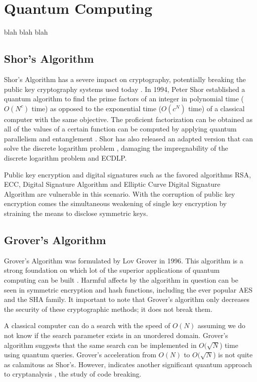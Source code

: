 \section{Quantum Computing}
blah blah blah

\subsection{Shor's Algorithm}
Shor's Algorithm has a severe impact on cryptography, potentially breaking the public key cryptography systems used today \cite{Q_Alg}.
In 1994, Peter Shor established a quantum algorithm to find the prime factors of an integer in polynomial time (\(O(N^c)\) time) as opposed to the exponential time (\(O(c^N)\) time) of a classical computer with the same objective. 
The proficient factorization can be obtained as all of the values of a certain function can be computed by applying quantum parallelism and entanglement \cite{Impact_QC_Cryptog_1}. 
Shor has also released an adapted version that can solve the discrete logarithm problem \cite{Post_Q_Cryptog}, damaging the impregnability of the discrete logarithm problem and ECDLP. 

Public key encryption and digital signatures such as the favored algorithms RSA, ECC, Digital Signature Algorithm and Elliptic Curve Digital Signature Algorithm are vulnerable in this scenario. With the corruption of public key encryption comes the simultaneous weakening of single key encryption by straining the means to disclose symmetric keys.

\subsection{Grover's Algorithm}
Grover's Algorithm was formulated by Lov Grover in 1996. This algorithm is a strong foundation on which lot of the superior applications of quantum computing can be built \cite{Post_Q_Cryptog}. Harmful affects by the algorithm in question can be seen in symmetric encryption and hash functions, including the ever popular AES and the SHA family. It important to note that Grover's algorithm only decreases the security of these cryptographic methods; it does not break them.

A classical computer can do a search with the speed of \(O(N)\) assuming we do not know if the search parameter exists in an unordered domain. Grover's algorithm suggests that the same search can be implemented in \(O(\sqrt{N}\)) time using quantum queries. Grover's acceleration from \(O(N)\) to \(O(\sqrt{N}\)) is not quite as calamitous as Shor's. However, indicates another significant quantum approach to cryptanalysis \cite{Quantum_Cryptanal}, the study of code breaking. 

